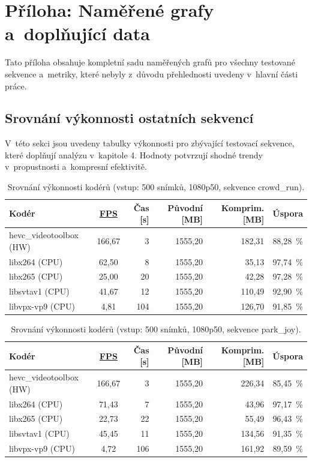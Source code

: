 \documentclass[11pt,a4paper]{article}
\begin{document}
\clearpage
\appendix
\section{Příloha: Naměřené grafy a~doplňující data}
\label{sec:appendix}

Tato příloha obsahuje kompletní sadu naměřených grafů pro všechny testované sekvence a~metriky, které nebyly z~důvodu přehlednosti uvedeny v~hlavní části práce.

\subsection*{Srovnání výkonnosti ostatních sekvencí}
V~této sekci jsou uvedeny tabulky výkonnosti pro zbývající testovací sekvence, které doplňují analýzu v~kapitole 4. Hodnoty potvrzují shodné trendy v~propustnosti a~kompresní efektivitě.

\begin{table}[H]
\centering
\caption{Srovnání výkonnosti kodérů (vstup: 500 snímků, 1080p50, sekvence crowd\_run).}
\begin{tabular}{|l|c|r|r|r|c|}
\hline
\textbf{Kodér} & \textbf{\hyperref[sec:derived_metrics]{FPS}} & \textbf{Čas [s]} & \textbf{Původní [MB]} & \textbf{Komprim. [MB]} & \textbf{Úspora} \\
\hline
hevc\_videotoolbox (HW) & 166,67 & 3 & 1555,20 & 182,31 & 88,28\ \% \\
libx264 (CPU) & 62,50 & 8 & 1555,20 & 35,13 & 97,74\ \% \\
libx265 (CPU) & 25,00 & 20 & 1555,20 & 42,28 & 97,28\ \% \\
libsvtav1 (CPU) & 41,67 & 12 & 1555,20 & 110,49 & 92,90\ \% \\
libvpx-vp9 (CPU) & 4,81 & 104 & 1555,20 & 126,70 & 91,85\ \% \\
\hline
\end{tabular}
\end{table}

\begin{table}[H]
\centering
\caption{Srovnání výkonnosti kodérů (vstup: 500 snímků, 1080p50, sekvence park\_joy).}
\begin{tabular}{|l|c|r|r|r|c|}
\hline
\textbf{Kodér} & \textbf{\hyperref[sec:derived_metrics]{FPS}} & \textbf{Čas [s]} & \textbf{Původní [MB]} & \textbf{Komprim. [MB]} & \textbf{Úspora} \\
\hline
hevc\_videotoolbox (HW) & 166,67 & 3 & 1555,20 & 226,34 & 85,45\ \% \\
libx264 (CPU) & 71,43 & 7 & 1555,20 & 43,96 & 97,17\ \% \\
libx265 (CPU) & 22,73 & 22 & 1555,20 & 55,49 & 96,43\ \% \\
libsvtav1 (CPU) & 45,45 & 11 & 1555,20 & 134,56 & 91,35\ \% \\
libvpx-vp9 (CPU) & 4,72 & 106 & 1555,20 & 161,92 & 89,59\ \% \\
\hline
\end{tabular}
\end{table}
\end{document}
